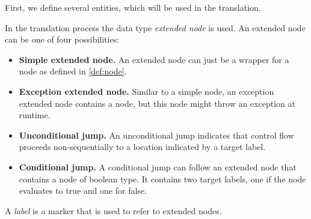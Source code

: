First, we define several entities, which will be used in the translation.

\begin{definition}
    In the translation process the data type \emph{extended node} is used.
    An extended node can be one of four possibilities:
    \begin{itemize}
        \item \textbf{Simple extended node.} An extended node can just be a wrapper for a node
        as defined in \autoref{def:node}.
        \item \textbf{Exception extended node.} Similar to a simple node, an exception extended
        node contains a node, but this node might throw an exception at runtime.
        \item \textbf{Unconditional jump.} An unconditional jump indicates that control
        flow proceeds non-sequentially to a location indicated by a target label.
        \item \textbf{Conditional jump.} A conditional jump can follow an extended node
        that contains a node of boolean type. It contains two target labels, one if the
        node evaluates to true and one for false.
    \end{itemize}
\end{definition}
\begin{definition}[Label]
    A \emph{label} is a marker that is used to refer to extended nodes.
\end{definition}

